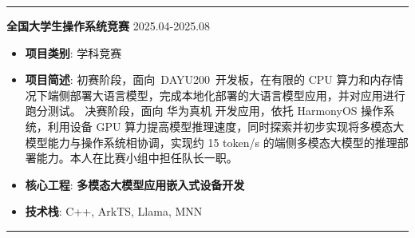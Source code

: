 \documentclass[11pt]{article}
\begin{document}


\par\noindent\textcolor{black!20}{\rule{\linewidth}{0.5pt}}

\vspace*{0.1em}

\textbf{\large \color{CVBlue} 全国大学生操作系统竞赛} \hfill 2025.04-2025.08
\begin{itemize}
    \item \textbf{项目类别}: 学科竞赛
    \item \textbf{项目简述}: 初赛阶段，面向\ DAYU200\ 开发板，在有限的 CPU 算力和内存情况下端侧部署大语言模型，完成本地化部署的大语言模型应用，并对应用进行跑分测试。 决赛阶段，面向 华为真机 开发应用，依托 HarmonyOS 操作系统，利用设备 GPU 算力提高模型推理速度，同时探索并初步实现将多模态大模型能力与操作系统相协调，实现约 15 token/s 的端侧多模态大模型的推理部署能力。本人在比赛小组中担任队长一职。
    \item[\textcolor{CVBlue}{\faStar}]\textbf{\textcolor{CVBlue}{核心工程}}: \textbf{多模态大模型应用嵌入式设备开发}
    \item \textbf{技术栈}: C++, ArkTS, Llama, MNN
\end{itemize}

\par\noindent\textcolor{black!20}{\rule{\linewidth}{0.5pt}}

\vspace*{0.1em}
\end{document}
